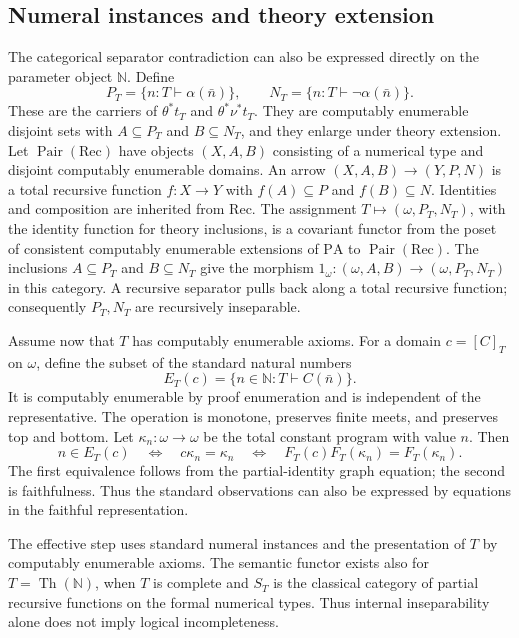 \documentclass[11pt]{article}
\newcommand{\N}{\mathbb N}
\newcommand{\PA}{\mathrm{PA}}
\begin{document}
\subsection{Numeral instances and theory extension}

The categorical separator contradiction can also be expressed directly
on the parameter object $\N$. Define
\[
 P_T=\{n:T\vdash\alpha(\bar n)\},\qquad
 N_T=\{n:T\vdash\neg\alpha(\bar n)\}.
\]
These are the carriers of $\theta^*t_T$ and $\theta^*\nu^*t_T$.
They are computably enumerable disjoint sets with $A\subseteq P_T$
and $B\subseteq N_T$, and they enlarge under theory extension.
Let $\operatorname{Pair}(\mathrm{Rec})$ have objects $(X,A,B)$ consisting
of a numerical type and disjoint computably enumerable domains.
An arrow $(X,A,B)\to(Y,P,N)$ is a total recursive function $f:X\to Y$
with $f(A)\subseteq P$ and $f(B)\subseteq N$. Identities and composition
are inherited from $\mathrm{Rec}$. The assignment
$T\mapsto(\omega,P_T,N_T)$, with the identity function for theory
inclusions, is a covariant functor from the poset of consistent
computably enumerable extensions of $\PA$ to
$\operatorname{Pair}(\mathrm{Rec})$.
The inclusions $A\subseteq P_T$ and $B\subseteq N_T$ give the morphism
$1_\omega:(\omega,A,B)\to(\omega,P_T,N_T)$ in this category.
A recursive separator pulls back along a total recursive function;
consequently $P_T,N_T$ are recursively inseparable.


Assume now that $T$ has computably enumerable axioms. For a domain
$c=[C]_T$ on $\omega$, define the subset of the standard natural numbers
\begin{equation}\label{eq:observation}
 E_T(c)=\{n\in\N:T\vdash C(\bar n)\}.
\end{equation}
It is computably enumerable by proof enumeration and is independent of
the representative. The operation is monotone, preserves finite meets,
and preserves top and bottom. Let $\kappa_n:\omega\to\omega$ be the
total constant program with value $n$. Then
\begin{equation}\label{eq:faithful-observation}
 n\in E_T(c)
 \quad\Longleftrightarrow\quad c\kappa_n=\kappa_n
 \quad\Longleftrightarrow\quad
 F_T(c)F_T(\kappa_n)=F_T(\kappa_n).
\end{equation}
The first equivalence follows from the partial-identity graph equation;
the second is faithfulness. Thus the standard observations can also be
expressed by equations in the faithful representation.


The effective step uses standard numeral instances and the presentation
of $T$ by computably enumerable axioms. The semantic functor exists also
for $T=\operatorname{Th}(\N)$, when $T$ is complete and $S_T$ is the
classical category of partial recursive functions on the formal numerical
types. Thus internal inseparability alone does not imply logical
incompleteness.
\end{document}
